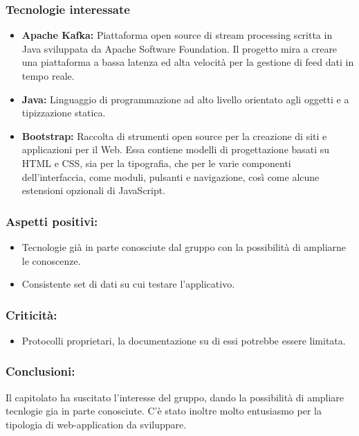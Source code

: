 	\subsubsection{Tecnologie interessate}
		\begin{itemize}
			\item \textbf{Apache Kafka:} Piattaforma open source di stream processing scritta in Java sviluppata da Apache Software Foundation. Il progetto mira a creare una piattaforma a bassa latenza ed alta velocità per la gestione di feed dati in tempo reale.
			\item \textbf{Java:} Linguaggio di programmazione ad alto livello orientato agli oggetti e a tipizzazione statica.
			\item \textbf{Bootstrap:} Raccolta di strumenti open source per la creazione di siti e applicazioni per il Web. Essa contiene modelli di progettazione basati su HTML e CSS, sia per la tipografia, che per le varie componenti dell'interfaccia, come moduli, pulsanti e navigazione, così come alcune estensioni opzionali di JavaScript.
		\end{itemize}

	\subsubsection{Aspetti positivi:}
		\begin{itemize}
			\item Tecnologie già in parte conosciute dal gruppo con la possibilità di ampliarne le conoscenze.
			\item Consistente set di dati su cui testare l'applicativo.
		\end{itemize}
	
	\subsubsection{Criticità:}
		\begin{itemize}
			\item Protocolli proprietari, la documentazione su di essi potrebbe essere limitata.
		\end{itemize}
		
	\subsubsection{Conclusioni:}
		Il capitolato ha suscitato l'interesse del gruppo, dando la possibilità di ampliare tecnlogie gia in parte conosciute. C'è stato inoltre molto entusiasmo per la tipologia di web-application da sviluppare.

